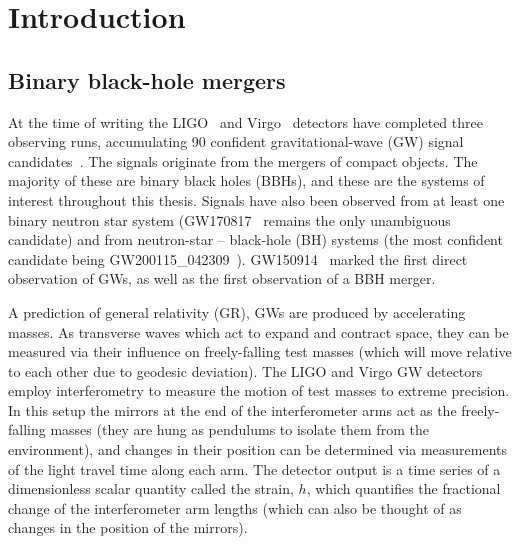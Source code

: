 
\chapter{Introduction}
\label{Chapter1}

\section{Binary black-hole mergers}
\label{ch1:sec:bbh_mergers}

At the time of writing the LIGO~\cite{LIGOScientific:2014pky} and Virgo~\cite{VIRGO:2014yos} detectors have completed three observing runs, accumulating 90 confident gravitational-wave (GW) signal candidates~\cite{LIGOScientific:2018mvr, LIGOScientific:2020ibl, LIGOScientific:2021usb, LIGOScientific:2021djp}.
The signals originate from the mergers of compact objects. 
The majority of these are binary black holes (BBHs), and these are the systems of interest throughout this thesis.  
Signals have also been observed from at least one binary neutron star system (GW170817~\cite{LIGOScientific:2017vwq} remains the only unambiguous candidate) and from neutron-star -- black-hole (BH) systems (the most confident candidate being GW200115\_042309~\cite{LIGOScientific:2021qlt}).
GW150914~\cite{LIGOScientific:2016aoc} marked the first direct observation of GWs, as well as the first observation of a BBH merger.

A prediction of general relativity (GR), GWs are produced by accelerating masses.
As transverse waves which act to expand and contract space, they can be measured via their influence on freely-falling test masses (which will move relative to each other due to geodesic deviation).
The LIGO and Virgo GW detectors employ interferometry to measure the motion of test masses to extreme precision. 
In this setup the mirrors at the end of the interferometer arms act as the freely-falling masses (they are hung as pendulums to isolate them from the environment), and changes in their position can be determined via measurements of the light travel time along each arm.
The detector output is a time series of a dimensionless scalar quantity called the strain, $h$, which quantifies the fractional change of the interferometer arm lengths (which can also be thought of as changes in the position of the mirrors). 

